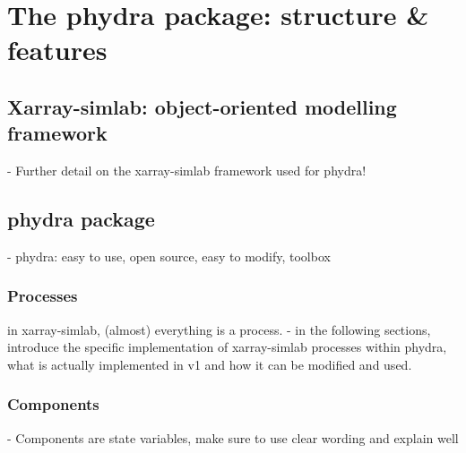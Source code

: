 \documentclass[template.tex]{subfiles}
\begin{document}
\section{The phydra package: structure \& features}

\subsection{Xarray-simlab: object-oriented modelling framework}
- Further detail on the xarray-simlab framework used for phydra!

\subsection{phydra package}
- phydra: easy to use, open source, easy to modify, toolbox

\subsubsection{Processes}
in xarray-simlab, (almost) everything is a process.
- in the following sections, introduce the specific implementation of xarray-simlab processes within phydra, what is actually implemented in v1 and how it can be modified and used.

\subsubsection{Components}
- Components are state variables, make sure to use clear wording and explain well
\end{document}
